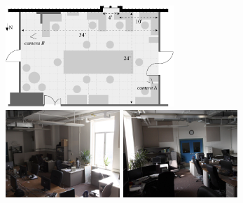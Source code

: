 \begin{figure}[t]
\newcommand{\figwidth}{1.7in}
\begin{center}
\includegraphics[width=2.5in]{lab.pdf} \vspace{0.1in}
\\
\includegraphics[width=\figwidth]{camera_angle_2_lights_off}
\includegraphics[width=\figwidth]{camera_angle_3_lights_off}\vspace{-0.21in}\\

\end{center}
\end{figure}
